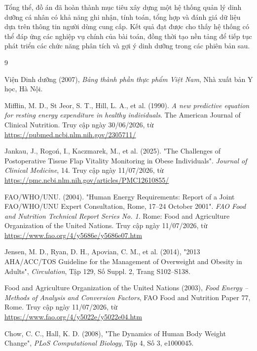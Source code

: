 \documentclass[12pt, a4paper]{report}
\begin{document}
Tổng thể, đồ án đã hoàn thành mục tiêu xây dựng một hệ thống quản lý dinh dưỡng cá nhân có khả năng ghi nhận, tính toán, tổng hợp và đánh giá dữ liệu dựa trên thông tin người dùng cung cấp. Kết quả đạt được cho thấy hệ thống có thể đáp ứng các nghiệp vụ chính của bài toán, đồng thời tạo nền tảng để tiếp tục phát triển các chức năng phân tích và gợi ý dinh dưỡng trong các phiên bản sau.

\clearpage
\pagestyle{empty}
\renewcommand{\bibname}{\centering TÀI LIỆU THAM KHẢO}

\begin{thebibliography}{9}
\thispagestyle{empty}

Viện Dinh dưỡng (2007),
\textit{Bảng thành phần thực phẩm Việt Nam},
Nhà xuất bản Y học, Hà Nội.

Mifflin, M. D., St Jeor, S. T., Hill, L. A., et al. (1990).
\textit{A new predictive equation for resting energy expenditure in healthy individuals}.
The American Journal of Clinical Nutrition.
Truy cập ngày 30/06/2026, từ \url{https://pubmed.ncbi.nlm.nih.gov/2305711/}

Jankau, J., Rogoń, I., Kaczmarek, M., et al. (2025).
"The Challenges of Postoperative Tissue Flap Vitality Monitoring in Obese Individuals".
\textit{Journal of Clinical Medicine}, 14.
Truy cập ngày 11/07/2026, từ \url{https://pmc.ncbi.nlm.nih.gov/articles/PMC12610855/}

FAO/WHO/UNU. (2004).
"Human Energy Requirements: Report of a Joint FAO/WHO/UNU Expert Consultation, Rome, 17–24 October 2001".
\textit{FAO Food and Nutrition Technical Report Series No. 1}.
Rome: Food and Agriculture Organization of the United Nations. Truy cập ngày 11/07/2026, từ \url{https://www.fao.org/4/y5686e/y5686e07.htm}

Jensen, M. D., Ryan, D. H., Apovian, C. M., et al. (2014),
"2013 AHA/ACC/TOS Guideline for the Management of Overweight and Obesity in Adults",
\textit{Circulation}, Tập 129, Số Suppl. 2, Trang S102--S138.

Food and Agriculture Organization of the United Nations (2003),
\textit{Food Energy -- Methods of Analysis and Conversion Factors},
FAO Food and Nutrition Paper 77, Rome. Truy cập ngày 11/07/2026, từ \url{https://www.fao.org/4/y5022e/y5022e04.htm}

Chow, C. C., Hall, K. D. (2008),
"The Dynamics of Human Body Weight Change",
\textit{PLoS Computational Biology}, Tập 4, Số 3, e1000045.


\end{thebibliography}
\end{document}
